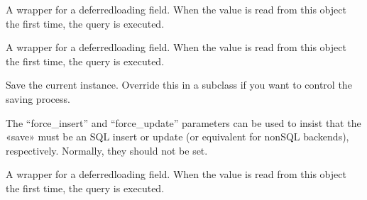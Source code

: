 \documentclass[letterpaper,10pt,spanish]{sphinxmanual}
\begin{document}
\begin{fulllineitems}
\begin{fulllineitems}
\pysigstartsignatures
{}
\pysigstopsignatures
\sphinxAtStartPar
A wrapper for a deferred\sphinxhyphen{}loading field. When the value is read from this
object the first time, the query is executed.

\end{fulllineitems}



\begin{fulllineitems}

\pysigstartsignatures
{}
\pysigstopsignatures
\sphinxAtStartPar
A wrapper for a deferred\sphinxhyphen{}loading field. When the value is read from this
object the first time, the query is executed.

\end{fulllineitems}



\begin{fulllineitems}

\pysigstartsignatures
{}
\pysigstopsignatures
\end{fulllineitems}



\begin{fulllineitems}

\pysigstartsignatures
{}
\pysigstopsignatures
\sphinxAtStartPar
Save the current instance. Override this in a subclass if you want to
control the saving process.

\sphinxAtStartPar
The “force\_insert” and “force\_update” parameters can be used to insist
that the «save» must be an SQL insert or update (or equivalent for
non\sphinxhyphen{}SQL backends), respectively. Normally, they should not be set.

\end{fulllineitems}



\begin{fulllineitems}

\pysigstartsignatures
{}
\pysigstopsignatures
\sphinxAtStartPar
A wrapper for a deferred\sphinxhyphen{}loading field. When the value is read from this
object the first time, the query is executed.


\end{fulllineitems}
\end{fulllineitems}
\end{document}

